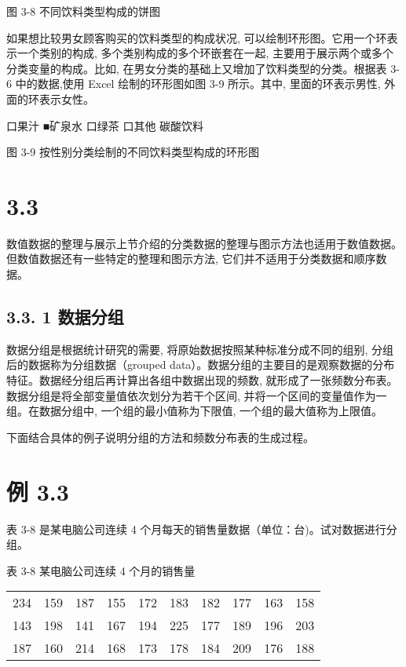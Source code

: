 \documentclass[10pt]{article}
\begin{document}
\begin{CJK*}{UTF8}{bsmi}
\begin{center}
\end{center}

图 3-8 不同饮料类型构成的饼图

如果想比较男女顾客购买的饮料类型的构成状况, 可以绘制环形图。它用一个环表示一个类别的构成, 多个类别构成的多个环嵌套在一起, 主要用于展示两个或多个分类变量的构成。比如, 在男女分类的基础上又增加了饮料类型的分类。根据表 3-6 中的数据,使用 Excel 绘制的环形图如图 3-9 所示。其中, 里面的环表示男性, 外面的环表示女性。

\begin{center}
\end{center}

口果汁 ■矿泉水 口绿茶 口其他 碳酸饮料

图 3-9 按性别分类绘制的不同饮料类型构成的环形图

\section*{3.3}
数值数据的整理与展示上节介绍的分类数据的整理与图示方法也适用于数值数据。但数值数据还有一些特定的整理和图示方法, 它们并不适用于分类数据和顺序数据。

\subsection*{3.3. 1 数据分组}
数据分组是根据统计研究的需要, 将原始数据按照某种标准分成不同的组别, 分组后的数据称为分组数据（grouped data）。数据分组的主要目的是观察数据的分布特征。数据经分组后再计算出各组中数据出现的频数, 就形成了一张频数分布表。数据分组是将全部变量值依次划分为若干个区间, 并将一个区间的变量值作为一组。在数据分组中, 一个组的最小值称为下限值, 一个组的最大值称为上限值。

下面结合具体的例子说明分组的方法和频数分布表的生成过程。

\section*{例 3.3}
表 3-8 是某电脑公司连续 4 个月每天的销售量数据（单位：台)。试对数据进行分组。

表 3-8 某电脑公司连续 4 个月的销售量

\begin{center}
\begin{tabular}{llllllllll}
\hline
234 & 159 & 187 & 155 & 172 & 183 & 182 & 177 & 163 & 158 \\
143 & 198 & 141 & 167 & 194 & 225 & 177 & 189 & 196 & 203 \\
187 & 160 & 214 & 168 & 173 & 178 & 184 & 209 & 176 & 188 \\
\hline
\end{tabular}
\end{center}


\end{CJK*}
\end{document}
